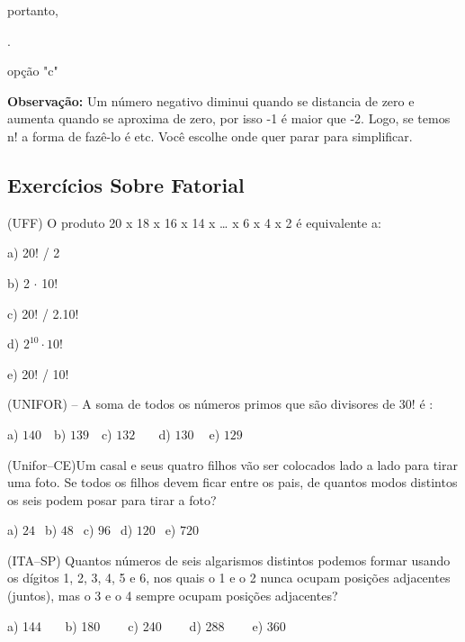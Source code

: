 \begin{multicols*}{2}
\begin{enumerate}
\begin{enumerate}
			            portanto,

			            .

			            opção "c"

		      \end{enumerate}

		      \textbf{Observação:} Um número negativo diminui quando se distancia de zero e aumenta quando se aproxima de zero, por isso -1 é maior que -2. Logo, se temos n! a forma de fazê-lo é  etc. Você escolhe onde quer parar para simplificar.

	\end{enumerate}


	\subsection{Exercícios Sobre Fatorial}

		\setcounter{numexercicio}{0}
		\execnum  (UFF) O produto 20 x 18 x 16 x 14 x … x 6 x 4 x 2 é equivalente a:

		      a) 20! / 2

		      b) 2 $\cdot$ 10!

		      c) 20! / 2.10!

		      d) $2^{10} \cdot 10!$

		      e) 20! / 10!

		\execnum  (UNIFOR) – A soma de todos os números primos que são divisores de 30! é :

		      a) $140 \ \ \ $ b) $139 \ \ \ $ c) $132 \ \ \ \ \ \ \ $ d) $130 \ \ \ \ $ e) $129 \ \ $

		\execnum  (Unifor–CE)Um casal e seus quatro filhos vão ser colocados lado a lado para tirar uma foto. Se todos os filhos devem ficar entre os pais, de quantos modos distintos os seis podem posar para tirar a foto?

		      a) $24 \ \ $ b) $48 \ \ $ c) $96 \ \ $ d) $120 \ \ $ e) $720 \ \ $

		\execnum  (ITA–SP) Quantos números de seis algarismos distintos podemos formar usando os dígitos 1, 2, 3, 4, 5 e 6, nos quais o 1 e o 2 nunca ocupam posições adjacentes (juntos), mas o 3 e o 4 sempre ocupam posições adjacentes?

		      a) 144$ \ \ \ \ \ \ \ $ b) 180 $ \ \ \ \ \ \ \ $ c) 240 $ \ \ \ \ \ \ \ $ d) 288 $ \ \ \ \ \ \ \ $ e) 360


\end{multicols*}
